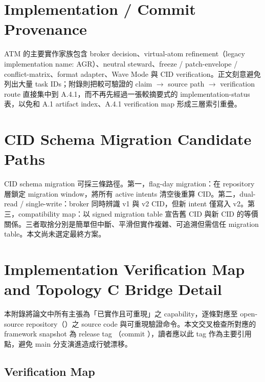 \documentclass[a4paper,fontset=none]{ctexart}
\begin{document}
\section*{Implementation / Commit Provenance}

ATM 的主要實作家族包含 broker decision、virtual-atom refinement（legacy implementation name: AGR）、neutral steward、freeze / patch-envelope / conflict-matrix、format adapter、Wave Mode 與 CID verification。正文刻意避免列出大量 task IDs；附錄則把較可驗證的 claim $\rightarrow$ source path $\rightarrow$ verification route 直接集中到 A.4.1，而不再先經過一張較摘要式的 implementation-status 表，以免和 A.1 artifact index、A.4.1 verification map 形成三層索引重疊。

\section*{CID Schema Migration Candidate Paths}

CID schema migration 可採三條路徑。第一，flag-day migration：在 repository 層鎖定 migration window，將所有 active intents 清空後重算 CID。第二，dual-read / single-write：broker 同時辨識 v1 與 v2 CID，但新 intent 僅寫入 v2。第三，compatibility map：以 signed migration table 宣告舊 CID 與新 CID 的等價關係。三者取捨分別是簡單但中斷、平滑但實作複雜、可追溯但需信任 migration table。本文尚未選定最終方案。

\section*{Implementation Verification Map and Topology C Bridge Detail}

本附錄將論文中所有主張為「已實作且可重現」之 capability，逐條對應至 open-source repository（\texttt{}）之 source code 與可重現驗證命令。本文交叉檢查所對應的 framework snapshot 為 release tag \texttt{}（commit \texttt{}），讀者應以此 tag 作為主要引用點，避免 main 分支演進造成行號漂移。

\subsection*{Verification Map}

\smallskip{}\par\smallskip
\end{document}
